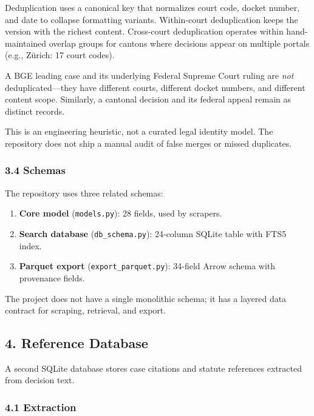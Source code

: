 \documentclass[
  11pt,
]{article}
\providecommand{\tightlist}{%
  \setlength{\itemsep}{0pt}\setlength{\parskip}{0pt}}
\begin{document}
Deduplication uses a canonical key that normalizes court code, docket
number, and date to collapse formatting variants. Within-court
deduplication keeps the version with the richest content. Cross-court
deduplication operates within hand-maintained overlap groups for cantons
where decisions appear on multiple portals (e.g., Zürich: 17 court
codes).

A BGE leading case and its underlying Federal Supreme Court ruling are
\emph{not} deduplicated---they have different courts, different docket
numbers, and different content scope. Similarly, a cantonal decision and
its federal appeal remain as distinct records.

This is an engineering heuristic, not a curated legal identity model.
The repository does not ship a manual audit of false merges or missed
duplicates.

\subsubsection{3.4 Schemas}\label{schemas}

The repository uses three related schemas:

\begin{enumerate}
\def\labelenumi{\arabic{enumi}.}
\tightlist
\item
  \textbf{Core model} (\texttt{models.py}): 28 fields, used by scrapers.
\item
  \textbf{Search database} (\texttt{db\_schema.py}): 24-column SQLite
  table with FTS5 index.
\item
  \textbf{Parquet export} (\texttt{export\_parquet.py}): 34-field Arrow
  schema with provenance fields.
\end{enumerate}

The project does not have a single monolithic schema; it has a layered
data contract for scraping, retrieval, and export.

\subsection{4. Reference Database}\label{reference-database}

A second SQLite database stores case citations and statute references
extracted from decision text.

\subsubsection{4.1 Extraction}\label{extraction}
\end{document}
